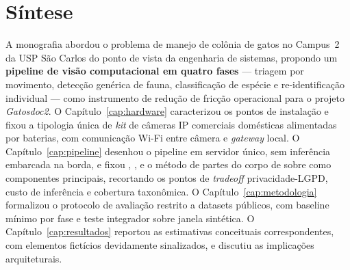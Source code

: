 \section{Síntese}
\label{sec:conclusao-sintese}

A monografia abordou o problema de manejo de colônia de gatos no Campus~2 da USP São Carlos do ponto de vista da engenharia de sistemas, propondo um \textbf{pipeline de visão computacional em quatro fases} --- triagem por movimento, detecção genérica de fauna, classificação de espécie e re-identificação individual --- como instrumento de redução de fricção operacional para o projeto \emph{Gatosdoc2}. O Capítulo~\ref{cap:hardware} caracterizou os pontos de instalação e fixou a tipologia única de \emph{kit} de câmeras IP comerciais domésticas alimentadas por baterias, com comunicação Wi-Fi entre câmera e \emph{gateway} local. O Capítulo~\ref{cap:pipeline} desenhou o pipeline em servidor único, sem inferência embarcada na borda, e fixou \modeloMD, \modeloSN, \modeloPetFace{} e o método de partes do corpo de \citeauthor{akbar2025bodypart} sobre \modeloWildlife{} como componentes principais, recortando os pontos de \emph{tradeoff} privacidade-LGPD, custo de inferência e cobertura taxonômica. O Capítulo~\ref{cap:metodologia} formalizou o protocolo de avaliação restrito a datasets públicos, com baseline mínimo por fase e teste integrador sobre janela sintética. O Capítulo~\ref{cap:resultados} reportou as estimativas conceituais correspondentes, com elementos fictícios devidamente sinalizados, e discutiu as implicações arquiteturais.
